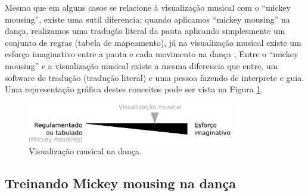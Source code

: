 Mesmo que em alguns casos se relacione à visualização musical com o ``mickey mousing'',
existe uma sutil diferencia; quando aplicamos ``mickey mousing'' na dança, 
realizamos uma  tradução literal da pauta aplicando simplesmente um conjunto de regras (tabela de mapeamento),
já na visualização musical existe um esforço imaginativo entre a pauta e cada movimento na dança \cite[pp. 177]{acocella2004mark},
Entre o ``mickey mousing'' e a visualização musical existe a mesma diferencia que entre,
um software de tradução (tradução literal) e uma pessoa fazendo de interprete e guia.
Uma representação gráfica destes conceitos pode ser vista na Figura \ref{fig:musicvisualization}.

\begin{figure}[h!]
    \centering
    \includegraphics[width=0.8\textwidth]{chapters/cap-musicalidade-tecnica/musicvisualization.eps}
    \caption{Visualização musical na dança.}
    \label{fig:musicvisualization}
\end{figure}

\subsection{Treinando Mickey mousing na dança} 




